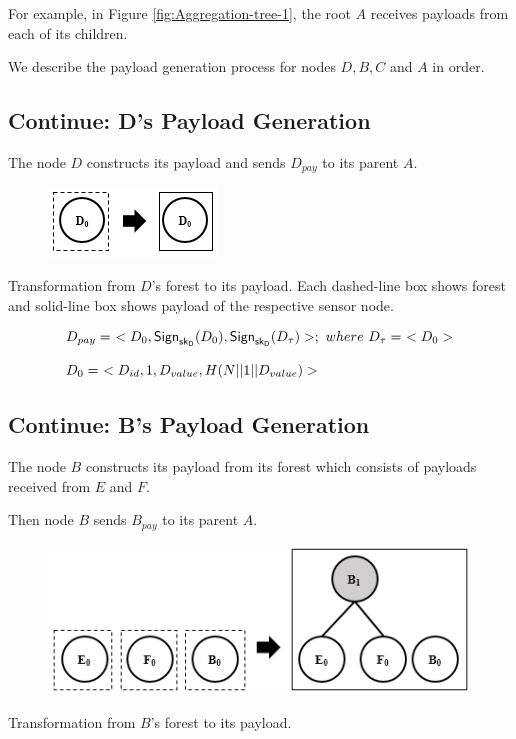 \documentclass[%
  slidesonly,%
  semlayer%
  ]{seminar}                                  %
\newcommand{\sk}{\sf{sk}}
\begin{document}
\begin{slide}
      For example, in Figure \ref{fig:Aggregation-tree-1}, the root $A$ receives payloads from each of its children.
        
      We describe the payload generation process for nodes $D,B,C$ and $A$ in order.
      \vfill
      \clearpage

    \subsection*{Continue: D's Payload Generation}
      The node $D$ constructs its payload and sends $D_{pay}$ to its parent $A$.
      
      \begin{figure}[h!]
        \centering
        \includegraphics[scale = 0.5]{images/d-forest-payload.png}
        \label{fig:d-forest-payload}
      \end{figure}
        \begin{center}
          Transformation from $D$'s forest to its payload.
          Each dashed-line box shows forest and solid-line box shows payload of the respective sensor node.
        \end{center}
      \begin{equation*}
        \begin{array}{l}
          D_{pay} =\ <D_{0}, \textsf{Sign}_{\sk_{D}}(D_{0}), \textsf{Sign}_{\sk_{D}}(D_{\tau})>;\ where\ D_{\tau} =\ <D_{0}>\\
          \\
          D_{0} =\ <D_{id},1,D_{value},H(N||1||D_{value})>
        \end{array}
      \end{equation*}

      \vfill
      \clearpage

    \subsection*{Continue: B's Payload Generation}  
      The node $B$ constructs its payload from its forest which consists of payloads received from $E$ and $F$.

      Then node $B$ sends $B_{pay}$ to its parent $A$.
      \begin{figure}[h!]
        \centering
        \includegraphics[scale = 0.5]{images/b-forest-payload.png}
      \end{figure}
      \begin{center}
        Transformation from $B$'s forest to its payload.
      \end{center}
      

\end{slide}
\end{document}
